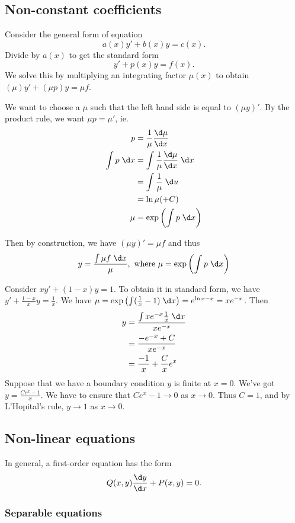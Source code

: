 \documentclass[a4paper]{article}
\begin{document}
  \subsection{Non-constant coefficients}
  Consider the general form of equation
  \[
    a(x)y' + b(x)y = c(x).
  \]
  Divide by $a(x)$ to get the standard form
  \[
    y' + p(x) y  = f(x).
  \]
  We solve this by multiplying an integrating factor $\mu (x)$ to obtain $(\mu)y' + (\mu p)y = \mu f$.

  We want to choose a $\mu$ such that the left hand side is equal to $(\mu y)'$. By the product rule, we want $\mu p = \mu'$, ie.
  \begin{align*}
    p &= \frac{1}{\mu}\frac{\d\mu }{\d x}\\
    \int p\; \d x &= \int \frac{1}{\mu}\frac{\d \mu}{\d x} \; \d x\\
    &= \int \frac{1}{\mu}\; \d u\\
    &= \ln \mu (+ C)\\
    \mu &= \exp\left(\int p\; \d x\right)
  \end{align*}

  Then by construction, we have $(\mu y)' = \mu f$ and thus
  \[
    y = \frac{\int \mu f\;\d x}{\mu},\text{ where } \mu = \exp\left(\int p\; \d x\right)
  \]
  \begin{eg}
    Consider $xy' + (1 - x)y = 1$. To obtain it in standard form, we have $y' + \frac{1 - x}{x} y = \frac{1}{x}$.
    We have $\mu = \exp\left(\int (\frac{1}{x} - 1)\; \d x\right) = e^{\ln x - x} = xe^{-x}$. Then 
    \begin{align*}
      y &= \frac{\int xe^{-x}\frac{1}{x}\;\d x}{xe^{-x}}\\
      &= \frac{-e^{-x} + C}{xe^{-x}}\\
      &= \frac{-1}{x} + \frac{C}{x}e^x
    \end{align*}
    Suppose that we have a boundary condition $y$ is finite at $x = 0$. We've got $y = \frac{Ce^x - 1}{x}$. We have to ensure that $Ce^x - 1\to 0$ as $x\to 0$. Thus $C = 1$, and by L'Hopital's rule, $y\to 1$ as $x\to 0$.
  \end{eg}

  \subsection{Non-linear equations}
  In general, a first-order equation has the form
  \[
    Q(x, y)\frac{\d y}{\d x} + P(x, y) = 0.
  \]
  \subsubsection{Separable equations}
\end{document}
